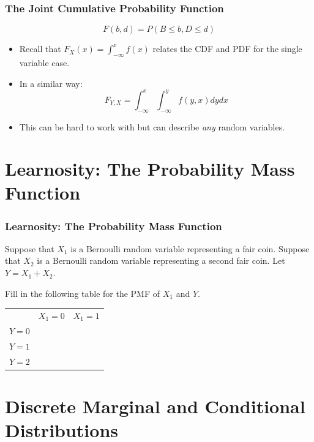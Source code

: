 \documentclass[12pt, block=fill]{beamer}
\begin{document}
\begin{frame}
  \frametitle{The Joint Cumulative Probability Function}
  $$F(b,d) = P(B \leq b, D \leq d)$$
  
  \begin{itemize}
  \item Recall that $F_{X}(x) = \int_{-\infty}^{x}f(x)$ relates the CDF
    and PDF for the single variable case.
  \item In a similar way:
    $$F_{Y,X} = \int_{-\infty}^{x}\int_{-\infty}^{y}f(y,x) dy dx$$
  \item This can be hard to work with but can describe \textit{any}
    random variables.
  \end{itemize}
  
     
\end{frame}

\section{Learnosity: The Probability Mass Function}

\begin{frame}
  \frametitle{Learnosity: The Probability Mass Function}
  
  Suppose that $X_1$ is a Bernoulli random variable representing a
  fair coin.  Suppose that $X_2$ is a Bernoulli random variable
  representing a second fair coin.  Let $Y = X_1 + X_2$.
  
  Fill in the following table for the PMF of $X_1$ and $Y$.
  
  \begin{tabular}{c|c|c}
    & $X_1 = 0$ & $X_1 = 1$ \\
    $Y=0$ & &  \\  
    $Y=1$ &  & \\  
    $Y=2$ & & \\
  \end{tabular}
\end{frame}

\section{Discrete Marginal and Conditional Distributions} 
\end{document}
